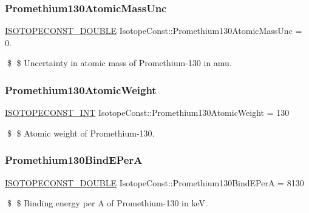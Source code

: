 \subsubsection{\texorpdfstring{Promethium130\+Atomic\+Mass\+Unc}{Promethium130AtomicMassUnc}}
{\footnotesize\ttfamily \mbox{\hyperlink{group___isotope_const-_macros_ga8f45a7272ce02c0b4c65c44636ed719a}{I\+S\+O\+T\+O\+P\+E\+C\+O\+N\+S\+T\+\_\+\+D\+O\+U\+B\+LE}} Isotope\+Const\+::\+Promethium130\+Atomic\+Mass\+Unc = 0.}

\$ \$ Uncertainty in atomic mass of Promethium-\/130 in amu. \mbox{\label{group___isotope_const-_promethium-_pm130_ga2808797b78c4d74106922dd2217c022d}} 
\subsubsection{\texorpdfstring{Promethium130\+Atomic\+Weight}{Promethium130AtomicWeight}}
{\footnotesize\ttfamily \mbox{\hyperlink{group___isotope_const-_macros_ga5f18360b3e99483a35c32d789e62621c}{I\+S\+O\+T\+O\+P\+E\+C\+O\+N\+S\+T\+\_\+\+I\+NT}} Isotope\+Const\+::\+Promethium130\+Atomic\+Weight = 130}

\$ \$ Atomic weight of Promethium-\/130. \mbox{\label{group___isotope_const-_promethium-_pm130_ga129882d9167961e67a7141da48f66366}} 
\subsubsection{\texorpdfstring{Promethium130\+Bind\+E\+PerA}{Promethium130BindEPerA}}
{\footnotesize\ttfamily \mbox{\hyperlink{group___isotope_const-_macros_ga8f45a7272ce02c0b4c65c44636ed719a}{I\+S\+O\+T\+O\+P\+E\+C\+O\+N\+S\+T\+\_\+\+D\+O\+U\+B\+LE}} Isotope\+Const\+::\+Promethium130\+Bind\+E\+PerA = 8130}

\$ \$ Binding energy per A of Promethium-\/130 in keV. \mbox{\label{group___isotope_const-_promethium-_pm130_ga28854a0b01f625b3bd45d77ca264ef06}} 
